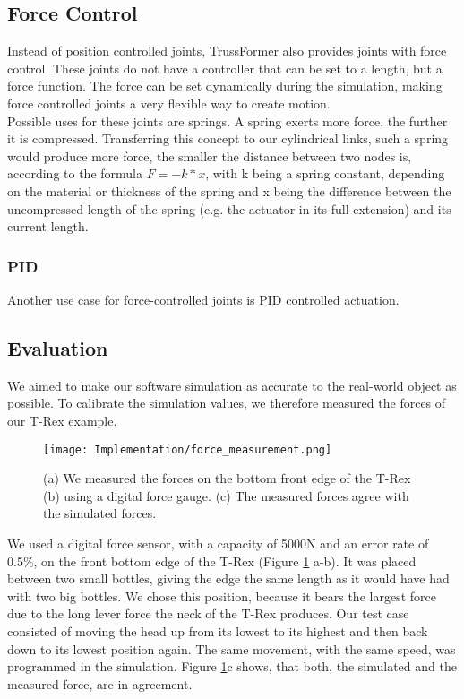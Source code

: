 \subsection{Force Control}
Instead of position controlled joints, TrussFormer also provides joints with force control. These joints do not have a controller that can be set to a length, but a force function. The force can be set dynamically during the simulation, making force controlled joints a very flexible way to create motion.\\
Possible uses for these joints are springs. A spring exerts more force, the further it is compressed. Transferring this concept to our cylindrical links, such a spring would produce more force, the smaller the distance between two nodes is, according to the formula $F = -k * x$, with k being a spring constant, depending on the material or thickness of the spring and x being the difference between the uncompressed length of the spring (e.g. the actuator in its full extension) and its current length.

\subsubsection{PID}\label{sec:pid}
Another use case for force-controlled joints is PID controlled actuation.

\subsection{Evaluation}
We aimed to make our software simulation as accurate to the real-world object as possible. To calibrate the simulation values, we therefore measured the forces of our T-Rex example.\\
\begin{figure}[h!]
    \texttt{[image: Implementation/force\_measurement.png]}
    \centering
    \caption{(a) We measured the forces on the bottom front edge of the T-Rex (b) using a digital force gauge. (c) The measured forces agree with the simulated forces.}
    \label{fig:force_measurement}
\end{figure}
We used a digital force sensor, with a capacity of 5000N and an error rate of 0.5\%, on the front bottom edge of the T-Rex (Figure \ref{fig:force_measurement} a-b). It was placed between two small bottles, giving the edge the same length as it would have had with two big bottles. We chose this position, because it bears the largest force due to the long lever force the neck of the T-Rex produces. Our test case consisted of moving the head up from its lowest to its highest and then back down to its lowest position again. The same movement, with the same speed, was programmed in the simulation. Figure \ref{fig:force_measurement}c shows, that both, the simulated and the measured force, are in agreement.

